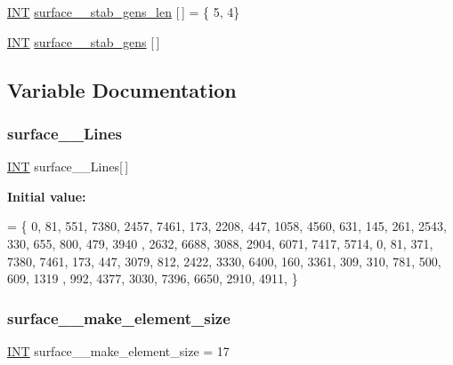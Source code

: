 \begin{DoxyCompactItemize}
\item 
\mbox{\hyperlink{galois_8h_a09fddde158a3a20bd2dcadb609de11dc}{I\+NT}} \mbox{\hyperlink{surface__9_8_c_a33edca07e7aaf00856914adb5a42d4c3}{surface\+\_\+\_\+stab\+\_\+gens\+\_\+len}} \mbox{[}$\,$\mbox{]} = \{ 5, 4\}
\item 
\mbox{\hyperlink{galois_8h_a09fddde158a3a20bd2dcadb609de11dc}{I\+NT}} \mbox{\hyperlink{surface__9_8_c_a88cde949b780fac42807ff141e790fcc}{surface\+\_\+\_\+stab\+\_\+gens}} \mbox{[}$\,$\mbox{]}
\end{DoxyCompactItemize}


\subsection{Variable Documentation}
\mbox{\label{surface__9_8_c_a5d4cef4aecb6d548cb5fd4eb8c9309d4}} 
\subsubsection{\texorpdfstring{surface\+\_\+\_\+\+Lines}{surface\_9\_Lines}}
{\footnotesize\ttfamily \mbox{\hyperlink{galois_8h_a09fddde158a3a20bd2dcadb609de11dc}{I\+NT}} surface\+\_\+\_\+\+Lines\mbox{[}$\,$\mbox{]}}

{\bfseries Initial value\+:}
\begin{DoxyCode}
= \{ 
    0, 81, 551, 7380, 2457, 7461, 173, 2208, 447, 1058, 4560, 631, 145, 261, 2543, 330, 655, 800, 479, 3940
      , 2632, 6688, 3088, 2904, 6071, 7417, 5714, 
    0, 81, 371, 7380, 7461, 173, 447, 3079, 812, 2422, 3330, 6400, 160, 3361, 309, 310, 781, 500, 609, 1319
      , 992, 4377, 3030, 7396, 6650, 2910, 4911, 
\}
\end{DoxyCode}
\mbox{\label{surface__9_8_c_ad81a8479820b313fd10163e521792a83}} 
\subsubsection{\texorpdfstring{surface\+\_\+\_\+make\+\_\+element\+\_\+size}{surface\_9\_make\_element\_size}}
{\footnotesize\ttfamily \mbox{\hyperlink{galois_8h_a09fddde158a3a20bd2dcadb609de11dc}{I\+NT}} surface\+\_\+\_\+make\+\_\+element\+\_\+size = 17}

